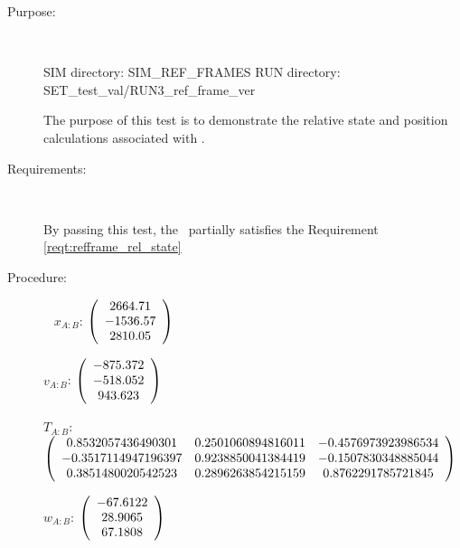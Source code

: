 \label{test:refframe_test_3}
\begin{description}
\item[Purpose:] \ \newline

SIM directory: SIM\_REF\_FRAMES
RUN directory: SET\_test\_val/RUN3\_ref\_frame\_ver

The purpose of this test is to demonstrate the relative state and
position calculations associated with .

\item[Requirements:] \ \newline

By passing this test, the \ partially satisfies
the Requirement \ref{reqt:refframe_rel_state}

\item[Procedure:] \ \newline
$x_{A:B}$:  $\left( \begin{array} {ccc} 2664.71 \\   -1536.57 \\    2810.05
\end{array} \right)\\ \\$

$v_{A:B}$:   $\left( \begin{array} {ccc}  -875.372 \\   -518.052 \\    943.623
\end{array} \right)\\ \\$

$T_{A:B}$:   $\left( \begin{array} {ccc}
0.8532057436490301 & 0.2501060894816011 & -0.4576973923986534 \\
-0.3517114947196397 & 0.9238850041384419 & -0.1507830348885044 \\
 0.3851480020542523 & 0.2896263854215159 & 0.8762291785721845
\end{array} \right)\\ \\$

$w_{A:B}$:   $\left( \begin{array} {ccc}  -67.6122 \\    28.9065 \\    67.1808
\end{array} \right)\\ \\$


\end{description}
